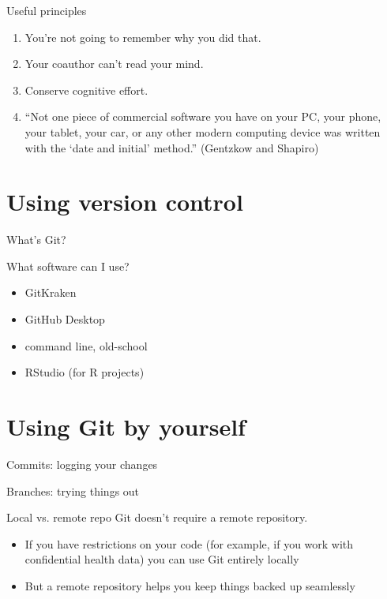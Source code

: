 \documentclass{beamer}
\begin{document}
\begin{frame}{Useful principles}
\begin{enumerate}
\item You're not going to remember why you did that.
\item Your coauthor can't read your mind.
\item Conserve cognitive effort.
\item ``Not one piece of commercial software you have on your PC, your phone, your tablet,
your car, or any other modern computing device was written with the `date and initial' method.'' (Gentzkow and Shapiro)
\end{enumerate}

\end{frame}

\section{Using version control}

\begin{frame}{What's Git?}
\end{frame}

\begin{frame}{What software can I use?}
\begin{itemize}
\item GitKraken
\item GitHub Desktop
\item command line, old-school
\item RStudio (for R projects)
\end{itemize}

\end{frame}

\section{Using Git by yourself}

\begin{frame}{Commits: logging your changes}
\end{frame}

\begin{frame}{Branches: trying things out}
\end{frame}

\begin{frame}{Local vs. remote repo}
Git doesn't require a remote repository.
\begin{itemize}
\item If you have restrictions on your code (for example, if you work with confidential health data) you can use Git entirely locally
\item But a remote repository helps you keep things backed up seamlessly
\end{itemize}

\end{frame}
\end{document}
